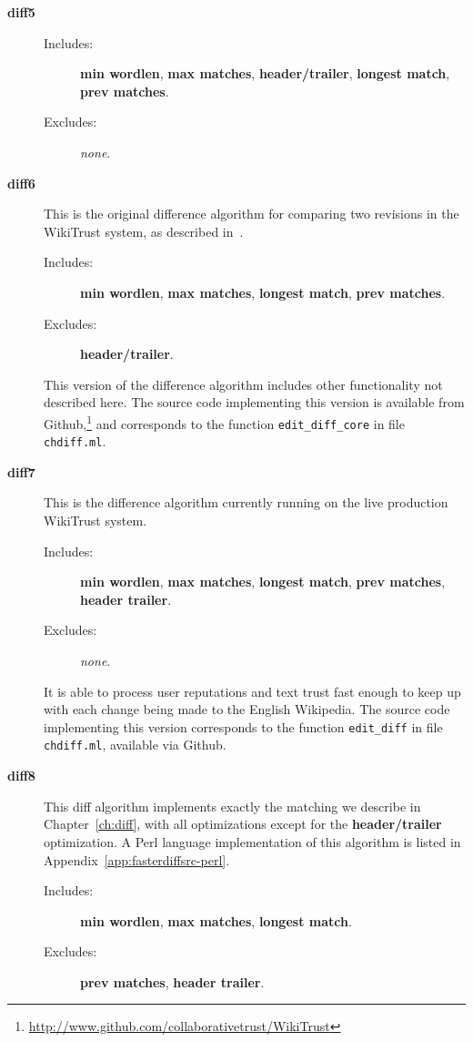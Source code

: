 \begin{description}
\item[\textbf{diff5}]
    \begin{description}
    \item[Includes:]
	\textbf{min wordlen}, \textbf{max matches},
	\textbf{header/trailer}, \textbf{longest match},
	\textbf{prev matches}.
    \item[Excludes:] \textit{none}.
    \end{description}

\item[\textbf{diff6}] This is the original difference algorithm
    for comparing two revisions in the WikiTrust system, as
    described in~\cite{Adler2007}.
    \begin{description}
    \item[Includes:]
	\textbf{min wordlen}, \textbf{max matches}, \textbf{longest match},
	\textbf{prev matches}.
    \item[Excludes:]
	\textbf{header/trailer}.
    \end{description}
    This version of the difference algorithm includes other
    functionality not described here.
    The source code implementing this version is available from
    Github,\footnote{\url{http://www.github.com/collaborativetrust/WikiTrust}}
    and corresponds to the function \texttt{edit\_diff\_core} in
    file \texttt{chdiff.ml}.

\item[\textbf{diff7}]
    This is the difference algorithm currently running on the live
    production
    WikiTrust system.
    \begin{description}
    \item[Includes:]
	\textbf{min wordlen}, \textbf{max matches}, \textbf{longest match},
	\textbf{prev matches}, \textbf{header trailer}.
    \item[Excludes:] \textit{none}.
    \end{description}
    It is able to process user reputations and text trust fast enough
    to keep up with each change being made to the English Wikipedia.
    The source code implementing this version
    corresponds to the function \texttt{edit\_diff} in
    file \texttt{chdiff.ml}, available via Github.

\item[\textbf{diff8}]
    This diff algorithm implements exactly the matching
    we describe in Chapter~\ref{ch:diff}, with all optimizations except
    for the \textbf{header/trailer} optimization.
    A Perl language implementation of
    this algorithm is listed in Appendix~\ref{app:fasterdiffsrc-perl}.
    \begin{description}
    \item[Includes:]
	\textbf{min wordlen}, \textbf{max matches}, \textbf{longest match}.
    \item[Excludes:]
	\textbf{prev matches}, \textbf{header trailer}.
    \end{description}


\end{description}
